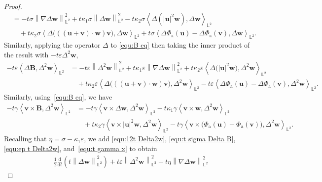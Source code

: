 \documentclass[11pt, reqno]{amsart}
\theoremstyle{definition}
\numberwithin{equation}{section}
\newcommand{\bff}{\boldsymbol}
\newcommand{\bb}{\mathbb}
\newcommand{\ddt}{\frac{\mathrm{d}}{\mathrm{d}t}}
\newcommand{\norm}[2]{\left\|{#1}\right\|_{#2}}
\newcommand{\inpro}[2]{\left\langle#1,#2\right\rangle}
\begin{document}
\begin{proof}
\begin{align}
    &=
    -
    t\sigma \norm{\nabla\Delta \bff{w}}{\bb{L}^2}^2
    +
    t\kappa_1 \sigma \norm{\Delta \bff{w}}{\bb{L}^2}^2
    -
    t\kappa_2 \sigma \inpro{\Delta(|\bff{u}|^2 \bff{w})}{\Delta \bff{w}}_{\bb{L}^2}
    \nonumber \\
    &\quad
    +
    t\kappa_2 \sigma \inpro{\Delta\big(((\bff{u}+\bff{v})\cdot \bff{w})\bff{v}\big)}{\Delta \bff{w}}_{\bb{L}^2}
    +
    t\sigma \inpro{\Delta\Phi_{\mathrm{a}}(\bff{u})- \Delta\Phi_{\mathrm{a}}(\bff{v})}{\Delta \bff{w}}_{\bb{L}^2}.
\end{align}
Similarly, applying the operator $\Delta$ to \eqref{equ:B eq} then taking the inner product of the result with $-t\varepsilon\Delta^2 \bff{w}$,
\begin{align}\label{equ:ep t Delta2w}
    -t\varepsilon\inpro{\Delta \bff{B}}{\Delta^2 \bff{w}}_{\bb{L}^2}
    &=
    -
    t\varepsilon \norm{\Delta^2 \bff{w}}{\bb{L}^2}^2
    +
    t\kappa_1 \varepsilon \norm{\nabla \Delta \bff{w}}{\bb{L}^2}^2
    +
    t\kappa_2 \varepsilon \inpro{\Delta \big(|\bff{u}|^2 \bff{w}\big)}{\Delta^2 \bff{w}}_{\bb{L}^2}
    \nonumber \\
    &\quad
    +
    t\kappa_2 \varepsilon \inpro{\Delta\big(((\bff{u}+\bff{v})\cdot \bff{w})\bff{v}\big)}{\Delta^2 \bff{w}}_{\bb{L}^2}
    -
    t\varepsilon \inpro{\Delta \Phi_{\mathrm{a}}(\bff{u})-\Delta \Phi_{\mathrm{a}}(\bff{v})}{\Delta^2 \bff{w}}_{\bb{L}^2}.
\end{align}
Similarly, using~\eqref{equ:B eq}, we have
\begin{align}\label{equ:t gamma x}
    -t\gamma \inpro{\bff{v}\times \bff{B}}{\Delta^2 \bff{w}}_{\bb{L}^2}
    &=
    -t\gamma \inpro{\bff{v}\times \Delta\bff{w}}{\Delta^2 \bff{w}}_{\bb{L}^2}
    -t\kappa_1 \gamma \inpro{\bff{v}\times \bff{w}}{\Delta^2 \bff{w}}_{\bb{L}^2}
    \nonumber \\
    &\quad
    +
    t\kappa_2 \gamma \inpro{\bff{v}\times |\bff{u}|^2 \bff{w}}{\Delta^2 \bff{w}}_{\bb{L}^2}
    -
    t\gamma \inpro{\bff{v} \times \big(\Phi_{\mathrm{a}}(\bff{u})-\Phi_{\mathrm{a}}(\bff{v})\big)}{\Delta^2 \bff{w}}_{\bb{L}^2}.
\end{align}
Recalling that $\eta=\sigma-\kappa_1\varepsilon$, we add \eqref{equ:12t Delta2w}, \eqref{equ:t sigma Delta B}, \eqref{equ:ep t Delta2w}, and~\eqref{equ:t gamma x} to obtain
\begin{align}\label{equ:J1 to J16}
    &\frac12 \ddt \left(t \norm{\Delta \bff{w}}{\bb{L}^2}^2 \right)
    +
    t\varepsilon \norm{\Delta^2 \bff{w}}{\bb{L}^2}^2
    +
    t\eta \norm{\nabla \Delta \bff{w}}{\bb{L}^2}^2

\end{align}
\end{proof}
\end{document}
